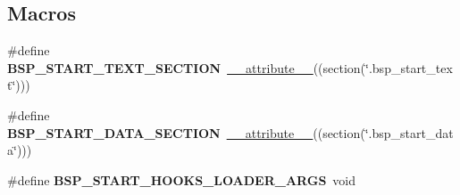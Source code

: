 \subsection*{Macros}
\begin{DoxyCompactItemize}
\item 
\mbox{\label{group__arm__start_gab4770e6e31de9d52c014827e6be91391}} 
\#define {\bfseries B\+S\+P\+\_\+\+S\+T\+A\+R\+T\+\_\+\+T\+E\+X\+T\+\_\+\+S\+E\+C\+T\+I\+ON}~\mbox{\hyperlink{struct____attribute____}{\+\_\+\+\_\+attribute\+\_\+\+\_\+}}((section(\char`\"{}.bsp\+\_\+start\+\_\+text\char`\"{})))
\item 
\mbox{\label{group__arm__start_ga1e04714d4b5de7f9f4f971b9f5ae48c8}} 
\#define {\bfseries B\+S\+P\+\_\+\+S\+T\+A\+R\+T\+\_\+\+D\+A\+T\+A\+\_\+\+S\+E\+C\+T\+I\+ON}~\mbox{\hyperlink{struct____attribute____}{\+\_\+\+\_\+attribute\+\_\+\+\_\+}}((section(\char`\"{}.bsp\+\_\+start\+\_\+data\char`\"{})))
\item 
\mbox{\label{group__arm__start_gad4a00206165354d5edd242e70430de6c}} 
\#define {\bfseries B\+S\+P\+\_\+\+S\+T\+A\+R\+T\+\_\+\+H\+O\+O\+K\+S\+\_\+\+L\+O\+A\+D\+E\+R\+\_\+\+A\+R\+GS}~void
\end{DoxyCompactItemize}
